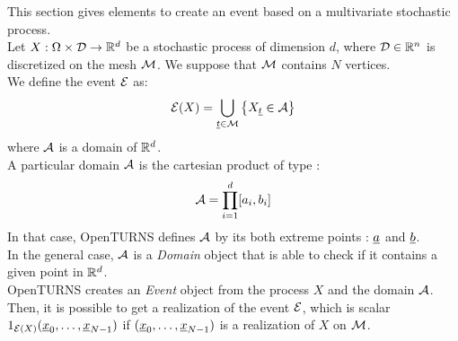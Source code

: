 \renewcommand{\filename}{docUC_EventProcess.tex}
\renewcommand{\filetitle}{UC : Creation of an  event based on a process}

\HeaderIIILevel

\label{EventProcess}



This section gives elements to create  an event based on a multivariate stochastic process.\\

Let $X: \Omega \times {\mathcal D} \rightarrow {\mathbb R}^d$ be a stochastic process of dimension $d$, where ${\mathcal D} \in {\mathbb R}^n$ is discretized on the mesh ${\mathcal M}$. We suppose that ${\mathcal M}$ contains $N$ vertices.\\

We define the event ${\mathcal E}$ as:
\begin{align}\label{eventProcStoch}
  \displaystyle {\mathcal E}(X) = \bigcup_{{\underline{t}}\in {\mathcal M}}\left\{X_{{\underline{t}}}  \in {\mathcal A}  \right\}
\end{align}
where ${\mathcal A}$ is a domain of ${\mathbb R}^d$. \\

A particular domain ${\mathcal A}$ is the cartesian product of type :
\begin{align*}
  {\mathcal A} = \prod_{i=1}^d [a_i,b_i]
\end{align*}
In that case, OpenTURNS defines ${\mathcal A}$ by its both extreme points : ${\underline{a}}$ and ${\underline{b}}$.\\

In the general case, ${\mathcal A}$ is a {\itshape Domain} object that is able to check if it contains a given point in ${\mathbb R}^d$.\\

OpenTURNS creates an {\itshape Event} object from the process $X$ and the domain ${\mathcal A}$. Then, it is possible to get a realization of the event ${\mathcal E}$, which is scalar $1_{{\mathcal E}(X)}({\underline{x}}_0, \dots, {\underline{x}}_{N-1})$ if $({\underline{x}}_0, \dots,{\underline{x}}_{N-1})$ is a realization of $X$ on ${\mathcal M}$. \\

